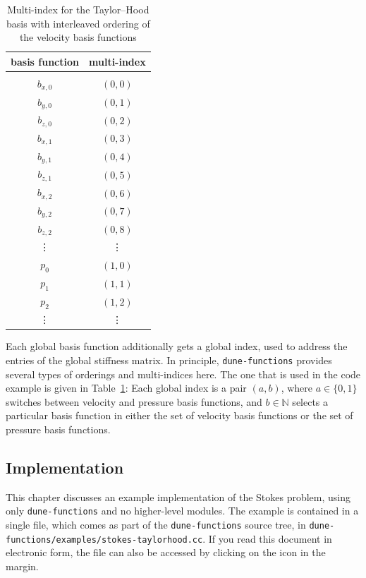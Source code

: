 \documentclass[a4paper,10pt,headings=normal,bibliography=totoc]{scrartcl}
\newcommand{\dunemodule}[1]{\texttt{#1}}
\newcommand{\file}[1]{\texttt{#1}}
\begin{document}
\begin{table}
 \begin{center}
 \begin{tabular}{c|c}
 basis function & multi-index \\
 \hline \\
  $b_{x,0}$  & $(0,0)$ \\
  $b_{y,0}$  & $(0,1)$ \\
  $b_{z,0}$  & $(0,2)$ \\
  $b_{x,1}$  & $(0,3)$ \\
  $b_{y,1}$  & $(0,4)$ \\
  $b_{z,1}$  & $(0,5)$ \\
  $b_{x,2}$  & $(0,6)$ \\
  $b_{y,2}$  & $(0,7)$ \\
  $b_{z,2}$  & $(0,8)$ \\
    \vdots   & \vdots  \\
  $p_0$      & $(1,0)$ \\
  $p_1$      & $(1,1)$ \\
  $p_2$      & $(1,2)$ \\
    \vdots   & \vdots
 \end{tabular}
 \end{center}
 \caption{Multi-index for the Taylor--Hood basis with interleaved ordering of the velocity basis functions}
 \label{tbl:th_multiindices_interleaved}
\end{table}

Each global basis function additionally gets a global index, used to address the entries of the global stiffness
matrix.  In principle, \dunemodule{dune-functions} provides several types of orderings and multi-indices here.
The one that is used in the code example is given  in Table~\ref{tbl:th_multiindices_interleaved}: Each global
index is a pair $(a,b)$, where $a \in \{0,1\}$ switches between velocity and pressure basis functions,
and $b \in \mathbb{N}$ selects a particular basis function in either the set of velocity basis functions
or the set of pressure basis functions.


\subsection{Implementation}

This chapter discusses an example implementation of the Stokes problem, using only \dunemodule{dune-functions}
and no higher-level modules.  The example is contained in a single file, which comes as part of the \dunemodule{dune-functions}
source tree, in \file{dune-functions/examples/stokes-taylorhood.cc}.  If you read this document in electronic form,
the file can also be accessed by clicking on the icon in the margin.%
%
\end{document}
